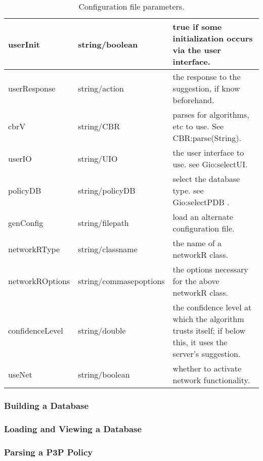 \begin{center}
\begin{table}[h!]
\begin{tabular} { | l | l | p{7cm} | }
      userInit & string/boolean	& true if some initialization occurs via the user interface. \\ \hline
      userResponse & string/action	& the response to the suggestion, if know beforehand. \\ \hline
      cbrV & string/CBR & parses for algorithms, etc to use. See CBR:parse(String). \\ \hline
      userIO & string/UIO	& the user interface to use. see Gio:selectUI. \\ \hline
      policyDB & string/policyDB & select the database type. see Gio:selectPDB . \\ \hline
      genConfig	& string/filepath & load an alternate configuration file. \\ \hline
      networkRType & string/classname & the name of a networkR class. \\ \hline
      networkROptions & string/commasepoptions	& the options necessary for the above networkR class. \\ \hline
      confidenceLevel & string/double & the confidence level at which the algorithm trusts itself; if below this, it uses the server's suggestion. \\ \hline
      useNet & string/boolean & whether to activate network functionality. \\ \hline
      \hline
    \end{tabular}
    \caption{Configuration file parameters.}
  \end{table}
\end{center}

\subsubsection{Building a Database}

\subsubsection{Loading and Viewing a Database}

\subsubsection{Parsing a P3P Policy}